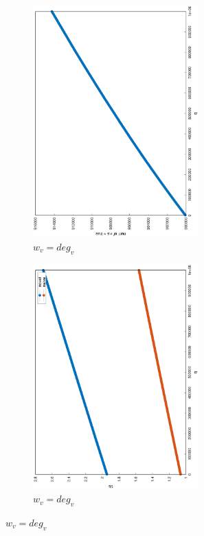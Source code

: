 \documentclass[12pt]{report}
\begin{document}
\begin{figure}
\begin{subfigure}{0.35\textwidth}
	\includegraphics[width=0.7\textwidth,angle=-90]{graph/ba_coverage_1000000_10_0.1_power_1.eps}
	\caption{$ w_v = \mathit{deg}_v $}
\end{subfigure}
\begin{subfigure}{0.35\textwidth}
	\includegraphics[width=0.7\textwidth,angle=-90]{graph/ba_q_1000000_10_0.1_power_1.eps}
	\caption{$ w_v = \mathit{deg}_v $}
\end{subfigure}


\end{figure}
\end{document}

